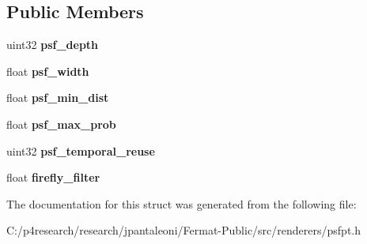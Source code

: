 \subsection*{Public Members}
\begin{DoxyCompactItemize}
\item 
\mbox{\label{struct_p_s_f_p_t_options_a227c8ab7ecadad6ca74981b2aeb6588e}} 
uint32 {\bfseries psf\+\_\+depth}
\item 
\mbox{\label{struct_p_s_f_p_t_options_ace1540e5cabb80b8058ef84aa5eb3605}} 
float {\bfseries psf\+\_\+width}
\item 
\mbox{\label{struct_p_s_f_p_t_options_ada3c62fe60df705a439e4d310ee1267a}} 
float {\bfseries psf\+\_\+min\+\_\+dist}
\item 
\mbox{\label{struct_p_s_f_p_t_options_accd6d96ecb60b7492e493fcded3fa78e}} 
float {\bfseries psf\+\_\+max\+\_\+prob}
\item 
\mbox{\label{struct_p_s_f_p_t_options_a464cbbccc92997641990eccb8198083a}} 
uint32 {\bfseries psf\+\_\+temporal\+\_\+reuse}
\item 
\mbox{\label{struct_p_s_f_p_t_options_afe7fc73b99d957b839d8c7f553a6b9c7}} 
float {\bfseries firefly\+\_\+filter}
\end{DoxyCompactItemize}


The documentation for this struct was generated from the following file\+:\begin{DoxyCompactItemize}
\item 
C\+:/p4research/research/jpantaleoni/\+Fermat-\/\+Public/src/renderers/psfpt.\+h\end{DoxyCompactItemize}
